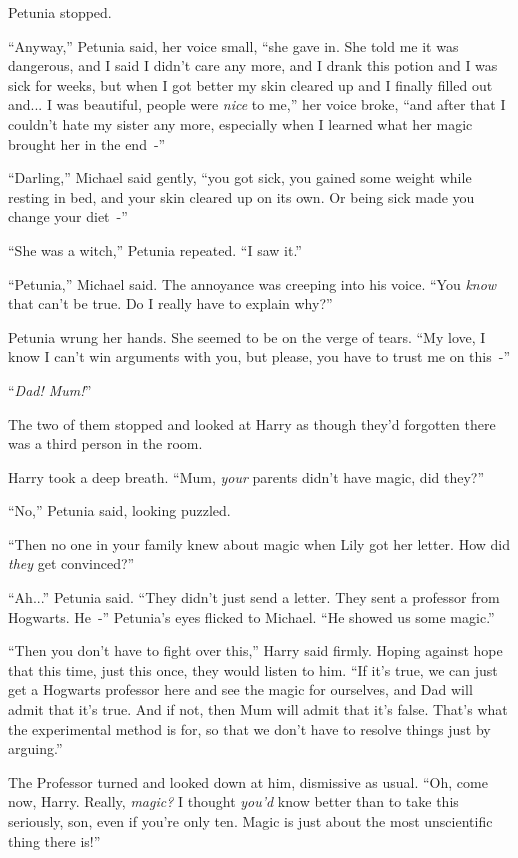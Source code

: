 Petunia stopped.

``Anyway,'' Petunia said, her voice small, ``she gave in. She told me it was dangerous, and I said I didn't care any more, and I drank this potion and I was sick for weeks, but when I got better my skin cleared up and I finally filled out and... I was beautiful, people were \emph{nice} to me,'' her voice broke, ``and after that I couldn't hate my sister any more, especially when I learned what her magic brought her in the end~-''

``Darling,'' Michael said gently, ``you got sick, you gained some weight while resting in bed, and your skin cleared up on its own. Or being sick made you change your diet~-''

``She was a witch,'' Petunia repeated. ``I saw it.''

``Petunia,'' Michael said. The annoyance was creeping into his voice. ``You \emph{know} that can't be true. Do I really have to explain why?''

Petunia wrung her hands. She seemed to be on the verge of tears. ``My love, I know I can't win arguments with you, but please, you have to trust me on this~-''

``\emph{Dad! Mum!}''

The two of them stopped and looked at Harry as though they'd forgotten there was a third person in the room.

Harry took a deep breath. ``Mum, \emph{your} parents didn't have magic, did they?''

``No,'' Petunia said, looking puzzled.

``Then no one in your family knew about magic when Lily got her letter. How did \emph{they} get convinced?''

``Ah...'' Petunia said. ``They didn't just send a letter. They sent a professor from Hogwarts. He~-'' Petunia's eyes flicked to Michael. ``He showed us some magic.''

``Then you don't have to fight over this,'' Harry said firmly. Hoping against hope that this time, just this once, they would listen to him. ``If it's true, we can just get a Hogwarts professor here and see the magic for ourselves, and Dad will admit that it's true. And if not, then Mum will admit that it's false. That's what the experimental method is for, so that we don't have to resolve things just by arguing.''

The Professor turned and looked down at him, dismissive as usual. ``Oh, come now, Harry. Really, \emph{magic?} I thought \emph{you'd} know better than to take this seriously, son, even if you're only ten. Magic is just about the most unscientific thing there is!''

